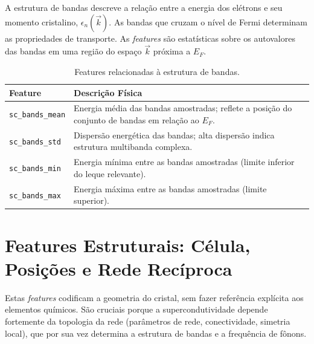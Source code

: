 \documentclass[12pt, a4paper, oneside]{report}
\begin{document}
A estrutura de bandas descreve a relação entre a energia dos elétrons e seu momento cristalino, $\epsilon_n(\vec{k})$. As bandas que cruzam o nível de Fermi determinam as propriedades de transporte. As \textit{features} são estatísticas sobre os autovalores das bandas em uma região do espaço $\vec{k}$ próxima a $E_F$.

\begin{table}[H]
    \centering
    \caption{Features relacionadas à estrutura de bandas.}
    \begin{tabular}{lp{10cm}}
        \toprule
        \textbf{Feature} & \textbf{Descrição Física} \\
        \midrule
        \texttt{sc\_bands\_mean} & Energia média das bandas amostradas; reflete a posição do conjunto de bandas em relação ao $E_F$. \\
        \texttt{sc\_bands\_std} & Dispersão energética das bandas; alta dispersão indica estrutura multibanda complexa. \\
        \texttt{sc\_bands\_min} & Energia mínima entre as bandas amostradas (limite inferior do leque relevante). \\
        \texttt{sc\_bands\_max} & Energia máxima entre as bandas amostradas (limite superior). \\
        \bottomrule
    \end{tabular}
\end{table}

\section{Features Estruturais: Célula, Posições e Rede Recíproca}

Estas \textit{features} codificam a geometria do cristal, sem fazer referência explícita aos elementos químicos. São cruciais porque a supercondutividade depende fortemente da topologia da rede (parâmetros de rede, conectividade, simetria local), que por sua vez determina a estrutura de bandas e a frequência de fônons.
\end{document}
